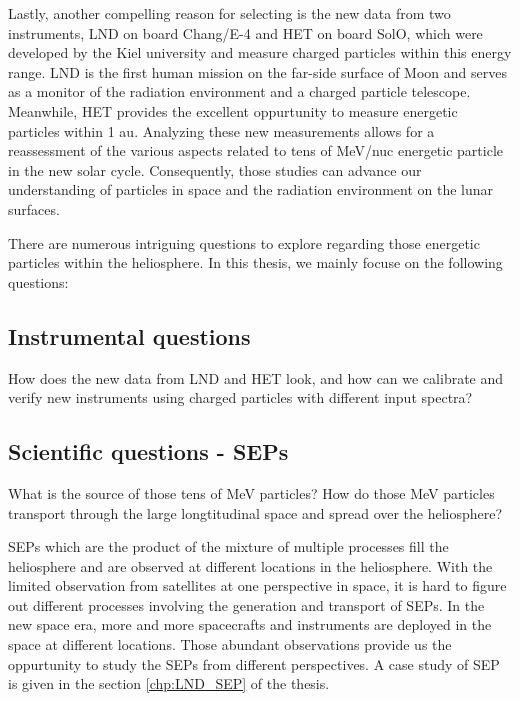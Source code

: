 Lastly, another compelling reason for selecting is the new data from two instruments, \ac{LND} on board Chang/E-4 and \ac{HET} on board \ac{SolO}, which were developed by the Kiel university and measure charged particles within this energy range. \ac{LND} is the first human mission on the far-side surface of Moon and serves as a monitor of the radiation environment and a charged particle telescope. Meanwhile, \ac{HET} provides the excellent oppurtunity to measure energetic particles within 1 au. Analyzing these new measurements allows for a reassessment of the various aspects related to tens of MeV/nuc energetic particle in the new solar cycle. Consequently, those studies can advance our understanding of particles in space and the radiation environment on the lunar surfaces.



There are numerous intriguing questions to explore regarding those energetic particles within the heliosphere. In this thesis, we mainly focuse on the following questions:

\subsection*{Instrumental questions}

How does the new data from \ac{LND} and \ac{HET} look, and how can we calibrate and verify new instruments using charged particles with different input spectra?

\subsection*{Scientific questions - \acp{SEP}}

What is the source of those tens of MeV particles? How do those MeV particles transport through the large longtitudinal space and spread over the heliosphere?
	
\acp{SEP} which are the product of the mixture of multiple processes fill the heliosphere and are observed at different locations in the heliosphere. With the limited observation from satellites at one perspective in space, it is hard to figure out different processes involving the generation and transport of \acp{SEP}. In the new space era, more and more spacecrafts and instruments are deployed in the space at different locations. Those abundant observations provide us the oppurtunity to study the \acp{SEP} from different perspectives. A case study of \ac{SEP} is given in the section \ref{chp:LND_SEP} of the thesis.

